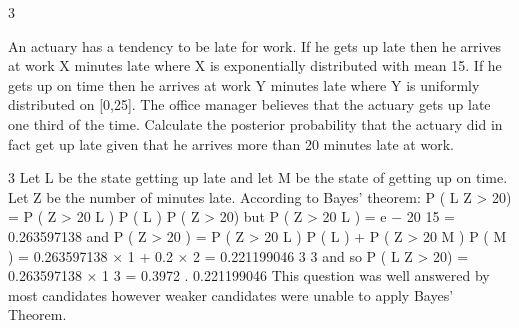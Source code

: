 \documentclass[a4paper,12pt]{article}
\begin{document}
3

An actuary has a tendency to be late for work. If he gets up late then he arrives at
work X minutes late where X is exponentially distributed with mean 15. If he gets up
on time then he arrives at work Y minutes late where Y is uniformly distributed on
[0,25]. The office manager believes that the actuary gets up late one third of the time.
Calculate the posterior probability that the actuary did in fact get up late given that he
arrives more than 20 minutes late at work.




3
Let L be the state getting up late and let M be the state of getting up on time.
Let Z be the number of minutes late.
According to Bayes’ theorem:
P ( L Z > 20) =
P ( Z > 20 L ) P ( L )
P ( Z > 20)
but
P ( Z > 20 L ) = e
−
20
15
= 0.263597138
and
P ( Z > 20 ) = P ( Z > 20 L ) P ( L ) + P ( Z > 20 M ) P ( M )
= 0.263597138 × 1 + 0.2 × 2 = 0.221199046
3
3
and so
P ( L Z > 20) =
0.263597138 × 1
3 = 0.3972 .
0.221199046
This question was well answered by most candidates however weaker candidates were unable
to apply Bayes' Theorem.
\end{document}
